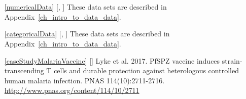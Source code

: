 





\section{}
\label{ch_summarizing_data_data}

\begin{itemize}
\item[\ref{numericalData}]
    [\datalink{loan50}, \datalink{county}]
    These data sets are described in
    Appendix~\ref{ch_intro_to_data_data}.

\item[\ref{categoricalData}]
    [\datalink{loan50}, \datalink{county}]
    These data sets are described in
    Appendix~\ref{ch_intro_to_data_data}.

\item[\ref{caseStudyMalariaVaccine}]
    [\datalink{malaria}]
    Lyke et al. 2017.
    PfSPZ vaccine induces strain-transcending T cells
    and durable protection against heterologous controlled
    human malaria infection.
    PNAS 114(10):2711-2716.
    \url{http://www.pnas.org/content/114/10/2711}
\end{itemize}









\section{}
\label{ch_probability_data}

